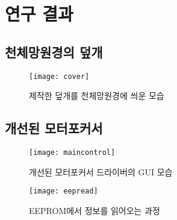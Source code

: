 \section{연구 결과}

\subsection{천체망원경의 덮개}

 \begin{figure}[h]
	\begin{center}
		\texttt{[image: cover]}
	\end{center}
	\caption{제작한 덮개를 천체망원경에 씌운 모습}
	\label{cover}
\end{figure}

\newpage
\subsection{개선된 모터포커서}

 \begin{figure}[h]
	\begin{center}
		\texttt{[image: maincontrol]}
	\end{center}
	\caption{개선된 모터포커서 드라이버의 GUI 모습}
	\label{maincontrol}
\end{figure}

 \begin{figure}[h]
	\begin{center}
		\texttt{[image: eepread]}
	\end{center}
	\caption{EEPROM에서 정보를 읽어오는 과정}
	\label{eepread}
\end{figure}